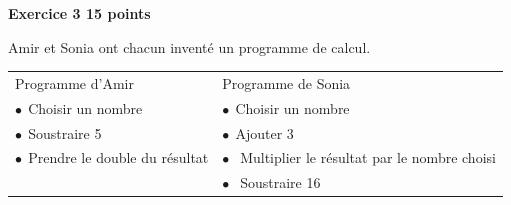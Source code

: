 \documentclass[11pt]{article}
\begin{document}
\bigskip

\textbf{Exercice 3 \hfill 15 points}

\medskip

Amir et Sonia ont chacun inventé un programme de calcul.

\begin{center}
\begin{tabularx}{\linewidth}{X X}
Programme d'Amir&Programme de Sonia\\
$\bullet~~$Choisir un nombre &$\bullet~~$Choisir un nombre \\
$\bullet~~$Soustraire 5&$\bullet~~$Ajouter 3\\
$\bullet~~$Prendre le double du résultat&$\bullet~~$ Multiplier le résultat par le nombre choisi\\
 &$\bullet~~$ Soustraire 16
\end{tabularx}
\end{center}
\end{document}

